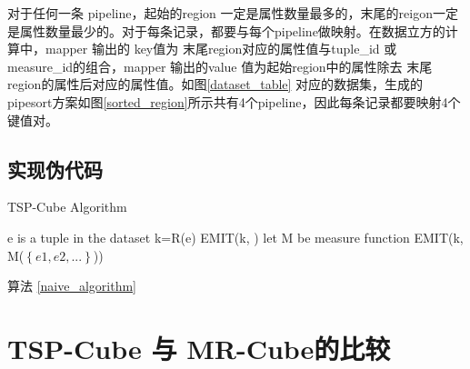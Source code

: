 对于任何一条 pipeline，起始的region 一定是属性数量最多的，末尾的reigon一定是属性数量最少的。对于每条记录，都要与每个pipeline做映射。在数据立方的计算中，mapper 输出的 key值为 末尾region对应的属性值与tuple\_id 或 measure\_id的组合，mapper 输出的value 值为起始region中的属性除去 末尾region的属性后对应的属性值。如图\ref{dataset_table} 对应的数据集，生成的pipesort方案如图\ref{sorted_region}所示共有4个pipeline，因此每条记录都要映射4个键值对。

\subsection{实现伪代码}

{\renewcommand\baselinestretch{1} 
\begin{algorithm}
\caption{TSP-Cube Algorithm}
\label{tscube_mr1}
{\fontfamily{\familydefault}\selectfont

	\begin{algorithmic}[1] %
    	\State e is a tuple in the dataset
        	\State k=R(e)
        	\State EMIT(k, )
        \EndFor
   	 \EndFunction
     \State
     	\State let M be measure function
        \State EMIT(k, M($\left\{ e1,e2,...\right\}$))
     \EndFunction
	\end{algorithmic}
}
\end{algorithm}
\par}

算法 \ref{naive_algorithm}

\section{TSP-Cube 与 MR-Cube的比较}









